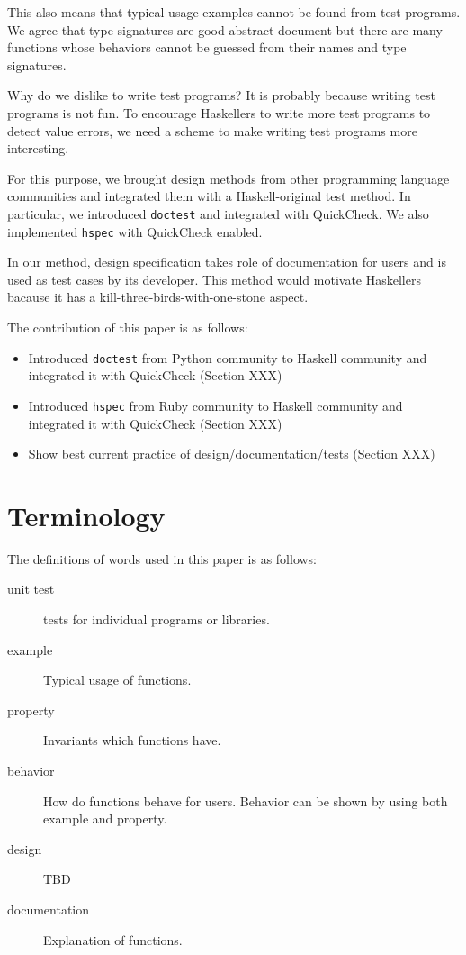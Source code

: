 \documentclass[preprint]{sigplanconf}
\begin{document}
This also means that typical usage examples cannot be found from test programs.
We agree that type signatures are good abstract document but
there are many functions whose behaviors cannot be guessed from
their names and type signatures.

Why do we dislike to write test programs?
It is probably because writing test programs is not fun.
To encourage Haskellers to write more test programs
to detect value errors,
we need a scheme to make writing test programs more interesting.

For this purpose,
we brought design methods from other programming language communities and
integrated them with a Haskell-original test method.
In particular, we introduced {\tt doctest} and
integrated with QuickCheck. 
We also implemented {\tt hspec} with QuickCheck enabled.

In our method, design specification takes role of documentation for users and
is used as test cases by its developer. 
This method would motivate Haskellers
bacause it has a kill-three-birds-with-one-stone aspect.



The contribution of this paper is as follows:

\begin{itemize}
\item Introduced {\tt doctest} from Python community to Haskell community
and integrated it with QuickCheck (Section XXX)
\item Introduced {\tt hspec} from Ruby community to Haskell community and
integrated it with QuickCheck (Section XXX)
\item Show best current practice of design/documentation/tests (Section XXX)
\end{itemize}

\section{Terminology}

The definitions of words used in this paper is as follows:

\begin{description}
\item[unit test] tests for individual programs or libraries.
\item[example] Typical usage of functions.
\item[property] Invariants which functions have.
\item[behavior] How do functions behave for users. Behavior can be shown by using both example and property.
\item[design] TBD
\item[documentation] Explanation of functions.
\end{description}
\end{document}
